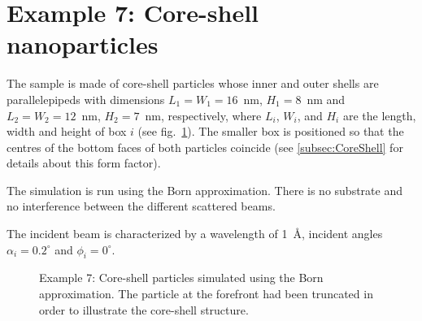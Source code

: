 \newpage
\section{Example 7: Core-shell nanoparticles}
The sample is made of core-shell particles whose inner and outer shells are parallelepipeds with dimensions  $L_1=W_1=16$~nm, $H_1=8$~nm and  $L_2=W_2=12$~nm, $H_2=7$~nm, respectively, where $L_i$, $W_i$, and $H_i$ are the length, width and height of box $i$ (see fig.~\ref{fig:PythonEx7Core}). The smaller box is positioned so that the centres of the bottom faces of both particles coincide (see \ref{subsec:CoreShell} for details about this form factor). 

The simulation is run using the Born approximation. There is no substrate and no interference between the different scattered beams.

The incident beam is characterized by a wavelength of 1~\AA, incident angles $\alpha_i=0.2^{\circ}$ and $\phi_i=0^{\circ}$.


\begin{figure}[H]
\hfill
{}
\hfill
{}
\hfill
\caption{Example 7: Core-shell particles simulated using the Born approximation. The particle at the forefront had been truncated in order to illustrate the core-shell structure.}
\label{fig:PythonEx7Core}
\end{figure}

